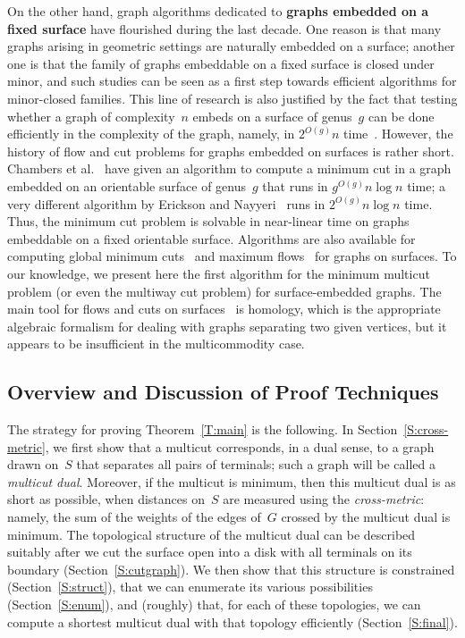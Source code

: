 \documentclass[11pt]{article}
\theoremstyle{plain}  \newtheorem{theorem}{Theorem}[section]
\theoremstyle{definition}
\begin{document}
\smallskip

On the other hand, graph algorithms dedicated to \textbf{graphs embedded on
  a fixed surface} have flourished during the last decade.  One reason is
that many graphs arising in geometric settings are naturally embedded on a
surface; another one is that the family of graphs embeddable on a fixed
surface is closed under minor, and such studies can be seen as a first step
towards efficient algorithms for minor-closed families.  This line of
research is also justified by the fact that testing whether a graph of
complexity~$n$ embeds on a surface of genus~$g$ can be done efficiently in
the complexity of the graph, namely, in $2^{O(g)}n$ time~\cite{m-ltaeg-99}.
However, the history of flow and cut problems for graphs embedded
on surfaces is rather short.  Chambers et al.~\cite{cen-mcshc-09} have
given an algorithm to compute a minimum cut in a graph embedded on an
orientable surface of genus~$g$ that runs in $g^{O(g)}n\log n$ time; a very
different algorithm by Erickson and Nayyeri~\cite{en-mcsnc-11} runs in
$2^{O(g)}n\log n$ time.  Thus, the minimum cut problem is solvable in
near-linear time on graphs embeddable on a fixed orientable surface.
Algorithms are also available for computing global minimum
cuts~\cite{efn-gmcse-12} and maximum flows~\cite{cen-hfcc-12} for graphs on
surfaces.  To our knowledge, we present here the first algorithm for the
minimum multicut problem (or even the multiway cut problem) for
surface-embedded graphs.  The main tool for flows and cuts on
surfaces~\cite{cen-hfcc-12,cen-mcshc-09,en-mcsnc-11,efn-gmcse-12} is
homology, which is the appropriate algebraic formalism for dealing with
graphs separating two given vertices, but it appears to be insufficient in
the multicommodity case.

\subsection*{Overview and Discussion of Proof Techniques}

The strategy for proving Theorem~\ref{T:main} is the following.  In
Section~\ref{S:cross-metric}, we first show that a multicut corresponds, in
a dual sense, to a graph drawn on~$S$ that separates all pairs of
terminals; such a graph will be called a \emph{multicut dual}.  Moreover,
if the multicut is minimum, then this multicut dual is as short as
possible, when distances on~$S$ are measured using the \emph{cross-metric}:
namely, the sum of the weights of the edges of~$G$ crossed by the multicut
dual is minimum.  The topological structure of the multicut dual can be
described suitably after we cut the surface open into a disk with all
terminals on its boundary (Section~\ref{S:cutgraph}).  We then show that
this structure is constrained (Section~\ref{S:struct}), that we can
enumerate its various possibilities (Section~\ref{S:enum}), and (roughly)
that, for each of these topologies, we can compute a shortest multicut dual
with that topology efficiently (Section~\ref{S:final}).
\end{document}
